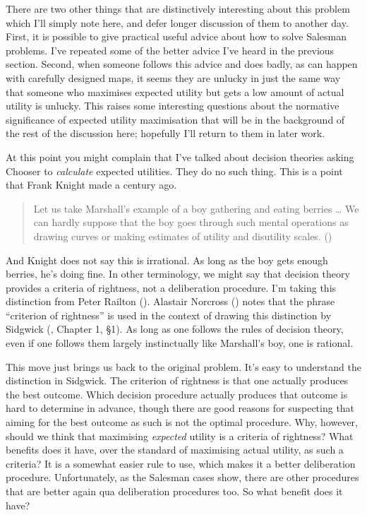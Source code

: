 \documentclass[
  11pt,
  letterpaper,
  DIV=11,
  numbers=noendperiod,
  twoside]{scrartcl}
\begin{document}
There are two other things that are distinctively interesting about this
problem which I'll simply note here, and defer longer discussion of them
to another day. First, it is possible to give practical useful advice
about how to solve Salesman problems. I've repeated some of the better
advice I've heard in the previous section. Second, when someone follows
this advice and does badly, as can happen with carefully designed maps,
it seems they are unlucky in just the same way that someone who
maximises expected utility but gets a low amount of actual utility is
unlucky. This raises some interesting questions about the normative
significance of expected utility maximisation that will be in the
background of the rest of the discussion here; hopefully I'll return to
them in later work.

At this point you might complain that I've talked about decision
theories asking Chooser to \emph{calculate} expected utilities. They do
no such thing. This is a point that Frank Knight made a century ago.

\begin{quote}
Let us take Marshall's example of a boy gathering and eating berries
\ldots{} We can hardly suppose that the boy goes through such mental
operations as drawing curves or making estimates of utility and
disutility scales. ()
\end{quote}

And Knight does not say this is irrational. As long as the boy gets
enough berries, he's doing fine. In other terminology, we might say that
decision theory provides a criteria of rightness, not a deliberation
procedure. I'm taking this distinction from Peter Railton
(). Alastair Norcross
() notes that the phrase ``criterion of
rightness'' is used in the context of drawing this distinction by
Sidgwick (, Chapter 1, §1). As
long as one follows the rules of decision theory, even if one follows
them largely instinctually like Marshall's boy, one is rational.

This move just brings us back to the original problem. It's easy to
understand the distinction in Sidgwick. The criterion of rightness is
that one actually produces the best outcome. Which decision procedure
actually produces that outcome is hard to determine in advance, though
there are good reasons for suspecting that aiming for the best outcome
as such is not the optimal procedure. Why, however, should we think that
maximising \emph{expected} utility is a criteria of rightness? What
benefits does it have, over the standard of maximising actual utility,
as such a criteria? It is a somewhat easier rule to use, which makes it
a better deliberation procedure. Unfortunately, as the Salesman cases
show, there are other procedures that are better again qua deliberation
procedures too. So what benefit does it have?
\end{document}
